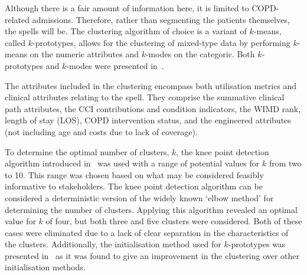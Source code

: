 Although there is a fair amount of information here, it is limited to
COPD-related admissions. Therefore, rather than segmenting the patients
themselves, the spells will be. The clustering algorithm of choice is a variant
of \(k\)-means, called \(k\)-prototypes, allows for the clustering of mixed-type
data by performing \(k\)- means on the numeric attributes and \(k\)-modes on the
categoric. Both \(k\)-prototypes and \(k\)-modes were presented
in~\cite{Huang1998}.

The attributes included in the clustering encompass both utilisation metrics and
clinical attributes relating to the spell. They comprise the summative clinical
path attributes, the CCI contributions and condition indicators, the WIMD rank,
length of stay (LOS), COPD intervention status, and the engineered attributes
(not including age and costs due to lack of coverage).

To determine the optimal number of clusters, \(k\), the knee point detection
algorithm introduced in~\cite{Satopaa2011} was used with a range of potential
values for \(k\) from two to 10. This range was chosen based on what may be
considered feasibly informative to stakeholders. The knee point detection
algorithm can be considered a deterministic version of the widely known `elbow
method' for determining the number of clusters. Applying this algorithm
revealed an optimal value for \(k\) of four, but both three and five clusters
were considered. Both of these cases were eliminated due to a lack of clear
separation in the characteristics of the clusters. Additionally, the
initialisation method used for \(k\)-prototypes was presented
in~\cite{Wilde2020} as it was found to give an improvement in the clustering
over other initialisation methods.

